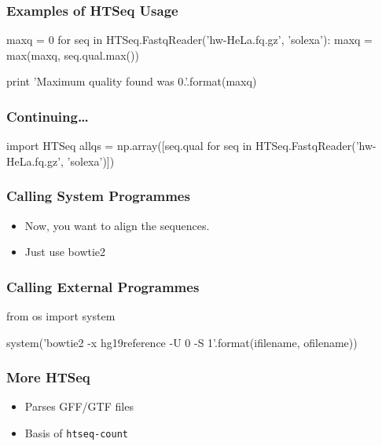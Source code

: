 \begin{frame}[fragile]
\frametitle{Examples of HTSeq Usage}

\begin{python}
maxq = 0
for seq in HTSeq.FastqReader('hw-HeLa.fq.gz', 'solexa'):
    maxq = max(maxq, seq.qual.max())

print 'Maximum quality found was {0}.'.format(maxq)
\end{python}

\end{frame}

\begin{frame}[fragile]
\frametitle{Continuing\ldots}

\begin{python}
import HTSeq
allqs = np.array([seq.qual
            for seq in
                HTSeq.FastqReader('hw-HeLa.fq.gz', 'solexa')])
\end{python}

\end{frame}

\begin{frame}[fragile]
\frametitle{Calling System Programmes}

\begin{itemize}
\item Now, you want to align the sequences.
\item Just use \alert{bowtie2}
\end{itemize}


\end{frame}

\begin{frame}[fragile]
\frametitle{Calling External Programmes}

\begin{python}
from os import system

system('bowtie2 -x hg19reference -U {0} -S {1}'.format(ifilename, ofilename))

\end{python}
\end{frame}

\begin{frame}[fragile]
\frametitle{More HTSeq}
\begin{itemize}
\item Parses GFF/GTF files
\item Basis of \texttt{htseq-count}
\end{itemize}
\end{frame}


